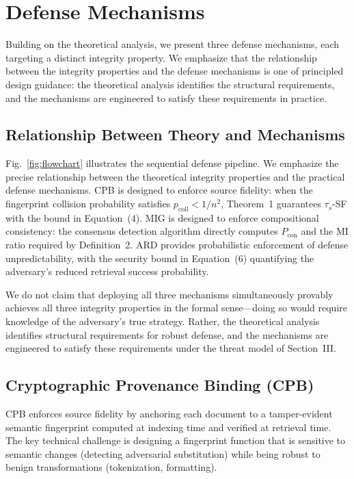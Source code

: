 \documentclass[journal,10pt]{IEEEtran}
\begin{document}
\section{Defense Mechanisms}\label{sec:defense}

Building on the theoretical analysis, we present three defense mechanisms, each targeting a distinct integrity property. We emphasize that the relationship between the integrity properties and the defense mechanisms is one of principled design guidance: the theoretical analysis identifies the structural requirements, and the mechanisms are engineered to satisfy these requirements in practice.

\subsection{Relationship Between Theory and Mechanisms}
Fig.~\ref{fig:flowchart} illustrates the sequential defense pipeline. We emphasize the precise relationship between the theoretical integrity properties and the practical defense mechanisms. CPB is designed to enforce source fidelity: when the fingerprint collision probability satisfies $p_{\mathrm{coll}} < 1/n^2$, Theorem~1 guarantees $\tau_s$-SF with the bound in Equation~(4). MIG is designed to enforce compositional consistency: the consensus detection algorithm directly computes $P_{\text{con}}$ and the MI ratio required by Definition~2. ARD provides probabilistic enforcement of defense unpredictability, with the security bound in Equation~(6) quantifying the adversary's reduced retrieval success probability.

We do not claim that deploying all three mechanisms simultaneously provably achieves all three integrity properties in the formal sense---doing so would require knowledge of the adversary's true strategy. Rather, the theoretical analysis identifies structural requirements for robust defense, and the mechanisms are engineered to satisfy these requirements under the threat model of Section~III.

\subsection{Cryptographic Provenance Binding (CPB)}
CPB enforces source fidelity by anchoring each document to a tamper-evident semantic fingerprint computed at indexing time and verified at retrieval time. The key technical challenge is designing a fingerprint function that is sensitive to semantic changes (detecting adversarial substitution) while being robust to benign transformations (tokenization, formatting).
\end{document}
